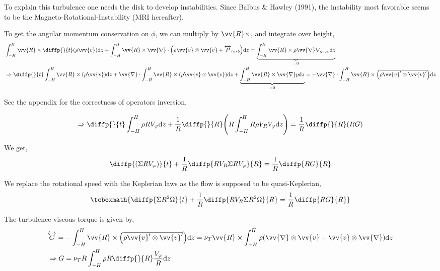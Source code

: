 \documentclass[10pt,a4paper,english]{article}
\let\originalleft\left
\let\originalright\right
\renewcommand{\left}{\mathopen{}\mathclose\bgroup\originalleft}
\renewcommand{\right}{\aftergroup\egroup\originalright}
\begin{document}

To explain this turbulence one needs the disk to develop instabilities. Since
Balbus \& Hawley (1991), the instability most favorable seems to be the
Magneto-Rotational-Instability (MRI hereafter).


To get the angular momentum conservation on $\phi$, we can multiply by $\vv{R} \times$, and integrate over height,
\begin{align*}
    &\int_{-H}^H \vv{R} \times \diffp{}{t}(\rho \vv{v}) \d{z} +
    \int_{-H}^H \vv{R} \times \vv{\nabla} \cdot \left(\rho \vv{v} \otimes \vv{v} + \tens{P}_{turb}\right) \d{z} =
    \underbrace{\int_{-H}^H \vv{R} \times \rho \vv{\nabla} \nabla_{grav} \d{z}}_{= 0} \\
    &\Rightarrow \diffp{}{t} \int_{-H}^H \vv{R} \times (\rho \vv{v}) \d{z} +
    \vv{\nabla} \cdot \int_{-H}^H \vv{R} \times \left( \rho \vv{v} \otimes \vv{v} \right) \d{z} +
    \underbrace{\int_{-H}^H \vv{R} \times \vv{\nabla} p \d{z}}_{= 0} =
    - \vv{\nabla} \cdot \int_{-H}^H \vv{R} \times \left(\overline{\rho \vv{v}' \otimes \vv{v}'}\right) \d{z}
\end{align*}

See the appendix for the correctness of operators inversion.


\begin{equation*}
    \Rightarrow \diffp{}{t} \int_{-H}^H \rho R V_\varphi \d{z} + \frac{1}{R} \diffp{}{R} \left( R \int_{-H}^H R \rho V_R V_\varphi \d{z} \right) =
    \frac{1}{R} \diffp{}{R} \left( R G \right)
\end{equation*}

We get,
\begin{equation*}
    \diffp{\left(\Sigma R V_\varphi\right)}{t} + \frac{1}{R} \diffp{R V_R \Sigma R V_\varphi}{R} = \frac{1}{R} \diffp{RG}{R}
\end{equation*}

We replace the rotational speed with the Keplerian laws as the flow is supposed to be quasi-Keplerian,
\begin{equation}
    \label{eq:alpha_moment}
    \tcboxmath{
        \diffp{\Sigma R^2 \Omega}{t} + \frac{1}{R} \diffp{R V_R \Sigma R^2 \Omega}{R} = \frac{1}{R} \diffp{RG}{R}
    }
\end{equation}

The turbulence viscous torque is given by,
\begin{align*}
    & \overleftrightarrow{G} = - \int_{-H}^H \vv{R} \times \left( \overline{\rho \vv{v}' \otimes \vv{v}'} \right) \d{z} =
    \nu_T \vv{R} \times \int_{-H}^H \rho \left(\vv{\nabla} \otimes \vv{v} + \vv{v} \otimes \vv{\nabla} \right) \d{z} \\
    & \Rightarrow G = \nu_T R \int_{-H}^{H} \rho R \diffp{}{R} \frac{V_\varphi}{R} \d{z}
\end{align*}
\end{document}

